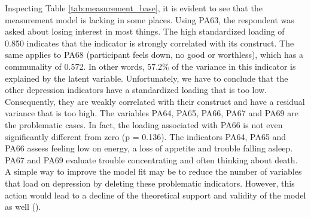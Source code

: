 \documentclass[11pt]{article}
\begin{document}
Inspecting Table \ref{tab:measurement_base}, it is evident to see that the
measurement model is lacking in some places.
Using PA63, the respondent was asked about losing interest in most things. The
high standardized loading of 0.850 indicates that the indicator is strongly
correlated with its construct. The same applies to PA68 (participant feels down,
no good or worthless), which has a communality of 0.572. In other words, 57.2\%
of the variance in this indicator is explained by the latent variable.
Unfortunately, we have to conclude that the other depression indicators have a
standardized loading that is too low. Consequently, they are weakly correlated
with their construct and have a residual variance that is too high. 
The variables PA64, PA65, PA66, PA67 and PA69 are the problematic cases. In fact,
the loading associated with PA66 is not even significantly different from zero
(p = 0.136). The indicators PA64, PA65 and PA66 assess feeling low on energy, a
loss of appetite and trouble falling asleep. PA67 and PA69 evaluate trouble
concentrating and often thinking about death. A simple way to improve the model
fit may be to reduce the number of variables that load on depression by deleting
these problematic indicators. However, this action would lead to a decline of
the theoretical support and validity of the model as well (\cite{hair2010}).
\end{document}
